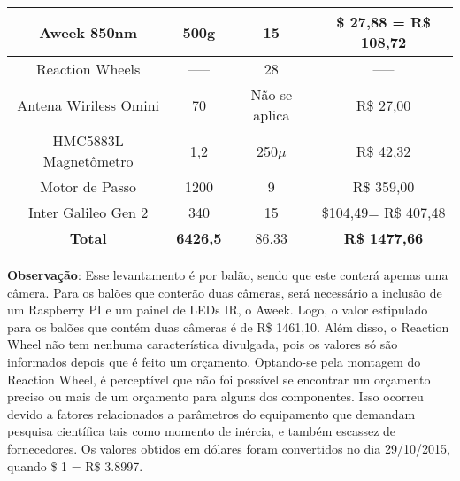 \begin{table}[H]
\begin{tabular}{|c|c|c|c|}
      Aweek 850nm                                                        & 500g             & 15			      & \$ 27,88 = R\$ 108,72                                                \\ \hline
      Reaction Wheels                                                    & -----            & 28  			      & -----                                                              \\ \hline
      Antena Wiriless Omini                                              & 70               & Não se aplica		      & R\$ 27,00                                                          \\ \hline
      HMC5883L Magnetômetro                                              & 1,2              & 250$\mu$				      & R\$ 42,32                                                  \\ \hline
      Motor de Passo                                                     & 1200             & 9			   	      & R\$ 359,00                                                         \\ \hline
      Inter Galileo Gen 2                                                & 340              & 15			      & \$104,49= R\$ 407,48                                                 \\ \hline
      \rowcolor[HTML]{9B9B9B}
      \textbf{Total}                                                     & \textbf{6426,5}  & 86.33			      & \textbf{R\$ 1477,66}                                               \\ \hline
    \end{tabular}
    \label{tab:pesoCustoComp}
  \end{table}


  \textbf{Observação}: Esse levantamento é por balão, sendo que este conterá apenas uma câmera. Para os balões que conterão duas câmeras, será necessário a inclusão de um Raspberry PI
  e um painel de LEDs IR, o Aweek. Logo, o valor estipulado para os balões que contém duas câmeras é de R\$ 1461,10. Além disso, o Reaction Wheel não tem nenhuma característica divulgada,
  pois os valores só são informados depois que é feito um orçamento. Optando-se pela montagem do Reaction Wheel, é perceptível que não foi possível se encontrar um orçamento preciso ou mais
  de um orçamento para alguns dos componentes. Isso ocorreu devido a fatores relacionados a parâmetros  do equipamento que demandam pesquisa científica tais como momento de inércia, e também
  escassez de fornecedores. Os valores obtidos em dólares foram convertidos no dia 29/10/2015, quando \$ 1 = R\$ 3.8997.

